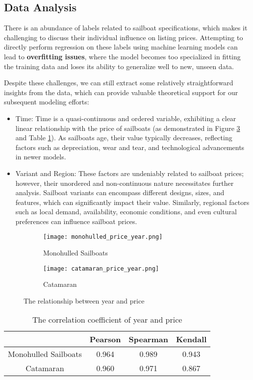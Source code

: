 \documentclass[12pt]{article}  %
\begin{document}
\subsection{Data Analysis}
There is an abundance of labels related to sailboat specifications, which makes it challenging to discuss their individual influence on listing prices.
Attempting to directly perform regression on these labels using machine learning models can lead to \textbf{overfitting issues}, where the model becomes too specialized in fitting the training data and loses its ability to generalize well to new, unseen data.

Despite these challenges, we can still extract some relatively straightforward insights from the data, which can provide valuable theoretical support for our subsequent modeling efforts:
\begin{itemize}
    \item Time: Time is a quasi-continuous and ordered variable, exhibiting a clear linear relationship with the price of sailboats (as demonstrated in Figure \ref{fig:year_price} and Table \ref{table: correlation_coefficient}). As sailboats age, their value typically decreases, reflecting factors such as depreciation, wear and tear, and technological advancements in newer models.
    \item Variant and Region: These factors are undeniably related to sailboat prices; however, their unordered and non-continuous nature necessitates further analysis. Sailboat variants can encompass different designs, sizes, and features, which can significantly impact their value. Similarly, regional factors such as local demand, availability, economic conditions, and even cultural preferences can influence sailboat prices.
\end{itemize}
\begin{figure}[htbp]
    \centering
    \begin{subfigure}[b]{.4\textwidth}
    \texttt{[image: monohulled\_price\_year.png]}
    \caption{Monohulled Sailboats}\label{subfig:mono_year}
    \end{subfigure}
    \begin{subfigure}[b]{.4\textwidth}
    \texttt{[image: catamaran\_price\_year.png]}
    \caption{Catamaran}\label{subfig:cata_year}
    \end{subfigure}
    \caption{The relationship between year and price}\label{fig:year_price}
\end{figure} 

\begin{table}[h!]
    \begin{center}
      \begin{tabular}{c|c|c|c}
        & Pearson & Spearman & Kendall\\
        \hline
        \hline
        Monohulled Sailboats&0.964 & 0.989 & 0.943 \\
        Catamaran  &0.960& 0.971 & 0.867\\
      \end{tabular}
      \caption{The correlation coefficient of year and price}\label{table: correlation_coefficient}
    \end{center}
\end{table}
\end{document}
